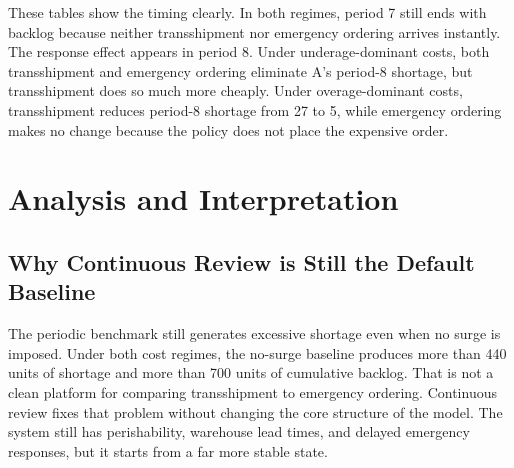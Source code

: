 \documentclass[11pt]{article}
\begin{document}
\begin{table}[H]
\centering
\caption{Period 6--9 focus: overage-dominant regime}
\label{tab:overage-focus}
\small
\setlength{\tabcolsep}{4pt}
\end{table}

These tables show the timing clearly. In both regimes, period 7 still ends with backlog because neither transshipment nor emergency ordering arrives instantly. The response effect appears in period 8. Under underage-dominant costs, both transshipment and emergency ordering eliminate A's period-8 shortage, but transshipment does so much more cheaply. Under overage-dominant costs, transshipment reduces period-8 shortage from 27 to 5, while emergency ordering makes no change because the policy does not place the expensive order.

\section{Analysis and Interpretation}
\subsection{Why Continuous Review is Still the Default Baseline}
The periodic benchmark still generates excessive shortage even when no surge is imposed. Under both cost regimes, the no-surge baseline produces more than 440 units of shortage and more than 700 units of cumulative backlog. That is not a clean platform for comparing transshipment to emergency ordering. Continuous review fixes that problem without changing the core structure of the model. The system still has perishability, warehouse lead times, and delayed emergency responses, but it starts from a far more stable state.
\end{document}
